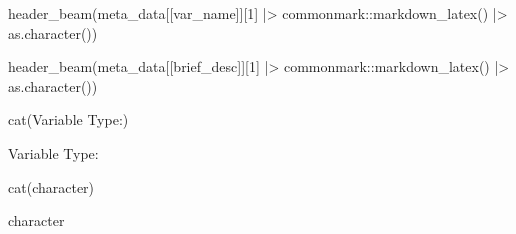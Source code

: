 \documentclass[
]{article}
\newenvironment{Shaded}{\begin{snugshade}}{\end{snugshade}}
\newcommand{\DecValTok}[1]{\textcolor[rgb]{0.00,0.00,0.81}{#1}}
\newcommand{\FunctionTok}[1]{\textcolor[rgb]{0.00,0.00,0.00}{#1}}
\newcommand{\NormalTok}[1]{#1}
\newcommand{\SpecialCharTok}[1]{\textcolor[rgb]{0.00,0.00,0.00}{#1}}
\newcommand{\StringTok}[1]{\textcolor[rgb]{0.31,0.60,0.02}{#1}}
\begin{document}
\begin{minipage}[t]{0.3\linewidth}

\begin{Shaded}
\begin{Highlighting}[]
\FunctionTok{header\_beam}\NormalTok{(meta\_data[[}\StringTok{\textquotesingle{}var\_name\textquotesingle{}}\NormalTok{]][}\DecValTok{1}\NormalTok{] }\SpecialCharTok{|\textgreater{}}\NormalTok{ commonmark}\SpecialCharTok{::}\FunctionTok{markdown\_latex}\NormalTok{() }\SpecialCharTok{|\textgreater{}} \FunctionTok{as.character}\NormalTok{())}
\end{Highlighting}
\end{Shaded}

\colorbox{mypink1}{}

\end{minipage}%
\begin{minipage}[t]{0.7\linewidth}

\begin{Shaded}
\begin{Highlighting}[]
\FunctionTok{header\_beam}\NormalTok{(meta\_data[[}\StringTok{\textquotesingle{}brief\_desc\textquotesingle{}}\NormalTok{]][}\DecValTok{1}\NormalTok{] }\SpecialCharTok{|\textgreater{}}\NormalTok{ commonmark}\SpecialCharTok{::}\FunctionTok{markdown\_latex}\NormalTok{() }\SpecialCharTok{|\textgreater{}} \FunctionTok{as.character}\NormalTok{())}
\end{Highlighting}
\end{Shaded}

\colorbox{mypink1}{\makebox[\textwidth]{\strut\bfseries\color{black}  
 }}

\end{minipage}

\begin{minipage}[t]{0.3\linewidth}

\begin{Shaded}
\begin{Highlighting}[]
\FunctionTok{cat}\NormalTok{(}\StringTok{\textquotesingle{}Variable Type:\textquotesingle{}}\NormalTok{)}
\end{Highlighting}
\end{Shaded}

Variable Type:

\end{minipage}%
\begin{minipage}[t]{0.7\linewidth}

\begin{Shaded}
\begin{Highlighting}[]
\FunctionTok{cat}\NormalTok{(}\StringTok{\textquotesingle{}character\textquotesingle{}}\NormalTok{)}
\end{Highlighting}
\end{Shaded}

character

\end{minipage}
\end{document}
